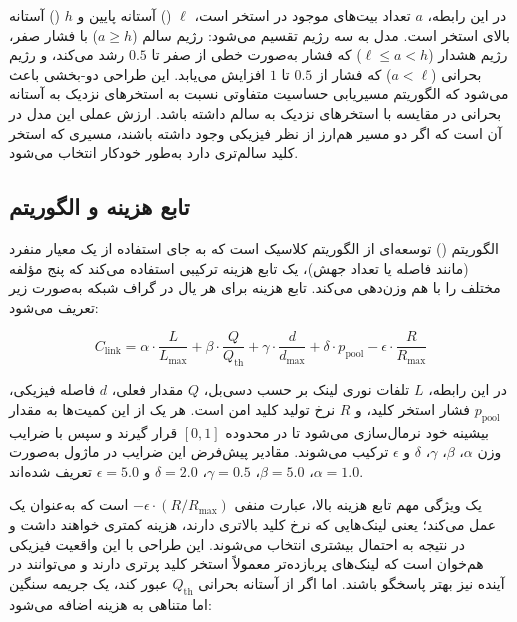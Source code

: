 در این رابطه، $a$ تعداد بیت‌های موجود در استخر است، $\ell$ () آستانه پایین و $h$ () آستانه بالای استخر است. مدل به سه رژیم تقسیم می‌شود: رژیم سالم ($a \geq h$) با فشار صفر، رژیم هشدار ($\ell \leq a < h$) که فشار به‌صورت خطی از صفر تا $0.5$ رشد می‌کند، و رژیم بحرانی ($a < \ell$) که فشار از $0.5$ تا $1$ افزایش می‌یابد. این طراحی دو-بخشی باعث می‌شود که الگوریتم مسیریابی حساسیت متفاوتی نسبت به استخرهای نزدیک به آستانه بحرانی در مقایسه با استخرهای نزدیک به سالم داشته باشد. ارزش عملی این مدل در آن است که اگر دو مسیر هم‌ارز از نظر فیزیکی وجود داشته باشند، مسیری که استخر کلید سالم‌تری دارد به‌طور خودکار انتخاب می‌شود.

\subsection{تابع هزینه  و الگوریتم }

الگوریتم  () توسعه‌ای از الگوریتم کلاسیک  است که به جای استفاده از یک معیار منفرد (مانند فاصله یا تعداد جهش)، یک تابع هزینه ترکیبی استفاده می‌کند که پنج مؤلفه مختلف را با هم وزن‌دهی می‌کند. تابع هزینه برای هر یال در گراف شبکه به‌صورت زیر تعریف می‌شود:

\begin{equation}
	C_{\text{link}} = \alpha \cdot \frac{L}{L_{\max}} + \beta \cdot \frac{Q}{Q_{\text{th}}} + \gamma \cdot \frac{d}{d_{\max}} + \delta \cdot p_{\text{pool}} - \epsilon \cdot \frac{R}{R_{\max}}
\end{equation}

در این رابطه، $L$ تلفات نوری لینک بر حسب دسی‌بل، $Q$ مقدار  فعلی، $d$ فاصله فیزیکی، $p_{\text{pool}}$ فشار استخر کلید، و $R$ نرخ تولید کلید امن است. هر یک از این کمیت‌ها به مقدار بیشینه خود نرمال‌سازی می‌شود تا در محدوده $[0, 1]$ قرار گیرند و سپس با ضرایب وزن $\alpha$، $\beta$، $\gamma$، $\delta$ و $\epsilon$ ترکیب می‌شوند. مقادیر پیش‌فرض این ضرایب در ماژول به‌صورت $\alpha = 1.0$، $\beta = 5.0$، $\gamma = 0.5$، $\delta = 2.0$ و $\epsilon = 5.0$ تعریف شده‌اند.

یک ویژگی مهم تابع هزینه بالا، عبارت منفی $-\epsilon \cdot (R/R_{\max})$ است که به‌عنوان یک  عمل می‌کند؛ یعنی لینک‌هایی که نرخ کلید بالاتری دارند، هزینه کمتری خواهند داشت و در نتیجه به احتمال بیشتری انتخاب می‌شوند. این طراحی با این واقعیت فیزیکی هم‌خوان است که لینک‌های پربازده‌تر معمولاً استخر کلید پرتری دارند و می‌توانند در آینده نیز بهتر پاسخگو باشند. اما اگر  از آستانه بحرانی $Q_{\text{th}}$ عبور کند، یک جریمه سنگین اما متناهی به هزینه اضافه می‌شود:

